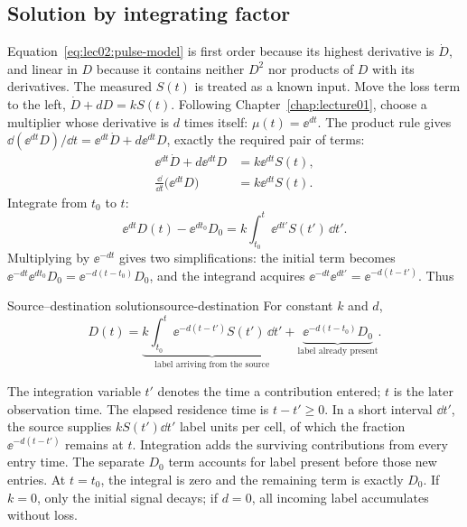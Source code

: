 \subsection{Solution by integrating factor}\label{subsec:lec02:solution}
Equation~\eqref{eq:lec02:pulse-model} is first order because its highest derivative is $\dot D$, and linear in $D$ because it contains neither $D^2$ nor products of $D$ with its derivatives. The measured $S(t)$ is treated as a known input. Move the loss term to the left, $\dot D+dD=kS(t)$. Following Chapter~\ref{chap:lecture01}, choose a multiplier whose derivative is $d$ times itself: $\mu(t)=\ee^{dt}$. The product rule gives $\dd(\ee^{dt}D)/\dd t=\ee^{dt}\dot D+d\ee^{dt}D$, exactly the required pair of terms:
\begin{align}
\ee^{dt}\dot D+d\ee^{dt}D&=k\ee^{dt}S(t),\label{eq:lec02:product-rule}\\
\frac{\dd}{\dd t}\bigl(\ee^{dt}D\bigr)&=k\ee^{dt}S(t).\label{eq:lec02:exact-derivative}
\end{align}
Integrate from $t_0$ to $t$:
\begin{equation}\label{eq:lec02:integrated}
\ee^{dt}D(t)-\ee^{dt_0}D_0=k\int_{t_0}^{t}\ee^{dt'}S(t')\,\dd t'.
\end{equation}
Multiplying by $\ee^{-dt}$ gives two simplifications: the initial term becomes $\ee^{-dt}\ee^{dt_0}D_0=\ee^{-d(t-t_0)}D_0$, and the integrand acquires $\ee^{-dt}\ee^{dt'}=\ee^{-d(t-t')}$. Thus

\begin{proposition}[unbreakable]{Source--destination solution}{source-destination}
For constant $k$ and $d$,
\begin{equation}\label{eq:lec02:pulse-solution}
D(t)=\underbrace{k\int_{t_0}^{t}\ee^{-d(t-t')}S(t')\,\dd t'}_{\text{label arriving from the source}}
+\underbrace{\ee^{-d(t-t_0)}D_0}_{\text{label already present}}.
\end{equation}
\end{proposition}

The integration variable $t'$ denotes the time a contribution entered; $t$ is the later observation time. The elapsed residence time is $t-t'\geq0$. In a short interval $\dd t'$, the source supplies $kS(t')\dd t'$ label units per cell, of which the fraction $\ee^{-d(t-t')}$ remains at $t$. Integration adds the surviving contributions from every entry time. The separate $D_0$ term accounts for label present before those new entries. At $t=t_0$, the integral is zero and the remaining term is exactly $D_0$. If $k=0$, only the initial signal decays; if $d=0$, all incoming label accumulates without loss.

